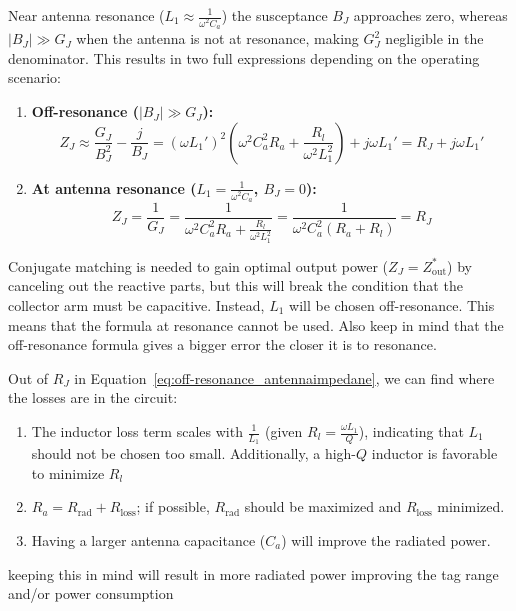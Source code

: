 Near antenna resonance ($L_1 \approx \frac{1}{\omega^2 C_a}$) the susceptance $B_J$ approaches zero, whereas $|B_J| \gg G_J$ when the antenna is not at resonance, making $G_J^2$ negligible in the denominator. This results in two full expressions depending on the operating scenario:

\begin{enumerate}
	\item \textbf{Off-resonance ($|B_J| \gg G_J$):}
	\begin{equation}
		Z_J \approx \frac{G_J}{B_J^2} - \frac{j}{B_J} = (\omega L_1')^2 \left(\omega^2 C_a^2 R_a + \frac{R_l}{\omega^2 L_1^2}\right) + j\omega L_1' = R_J + j\omega L_1'
		\label{eq:off-resonance_antennaimpedane}
	\end{equation}
	
	\item \textbf{At antenna resonance ($L_1 = \frac{1}{\omega^2 C_a}$, $B_J = 0$):}
	\begin{equation}
		Z_J = \frac{1}{G_J} = \frac{1}{\omega^2 C_a^2 R_a + \frac{R_l}{\omega^2 L_1^2}} = \frac{1}{\omega^2 C_a^2 (R_a + R_l)} = R_J
	\end{equation}
\end{enumerate}

Conjugate matching is needed to gain optimal output power ($Z_J = Z_{\text{out}}^*$) by canceling out the reactive parts, but this will break the condition that the collector arm must be capacitive. Instead, $L_1$ will be chosen off-resonance. This means that the formula at resonance cannot be used. Also keep in mind that the off-resonance formula gives a bigger error the closer it is to resonance.

Out of $R_J$ in Equation~\ref{eq:off-resonance_antennaimpedane}, we can find where the losses are in the circuit:
\begin{enumerate}
	\item The inductor loss term scales with $\frac{1}{L_1}$ (given $R_l = \frac{\omega L_1}{Q}$), indicating that $L_1$ should not be chosen too small. Additionally, a high-$Q$ inductor is favorable to minimize $R_l$
	\item $R_a = R_{\text{rad}} + R_{\text{loss}}$; if possible, $R_{\text{rad}}$ should be maximized and $R_{\text{loss}}$ minimized.
	\item Having a larger antenna capacitance ($C_a$) will improve the radiated power.
\end{enumerate}

keeping this in mind will result in more radiated power improving the tag range and/or power consumption





